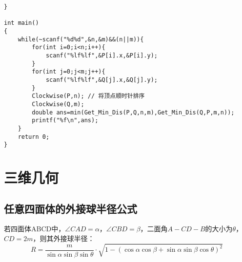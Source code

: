 \begin{lstlisting}
}

int main()
{
    while(~scanf("%d%d",&n,&m)&&(n||m)){
        for(int i=0;i<n;i++){
            scanf("%lf%lf",&P[i].x,&P[i].y);
        }
        for(int j=0;j<m;j++){
            scanf("%lf%lf",&Q[j].x,&Q[j].y);
        }
        Clockwise(P,n); // 将顶点顺时针排序
        Clockwise(Q,m);
        double ans=min(Get_Min_Dis(P,Q,n,m),Get_Min_Dis(Q,P,m,n));
        printf("%f\n",ans);
    }
    return 0;
}
\end{lstlisting}

\clearpage
\section{三维几何}

\subsection{任意四面体的外接球半径公式}
若四面体ABCD中，$\angle CAD=\alpha$，$\angle CBD=\beta$，二面角$A-CD-B$的大小为$\theta$，$CD=2m$，则其外接球半径：
$$R=\frac{m}{\sin \alpha \sin \beta \sin \theta}\cdot \sqrt{1-(\cos \alpha \cos \beta + \sin \alpha \sin \beta \cos \theta)^2}$$

